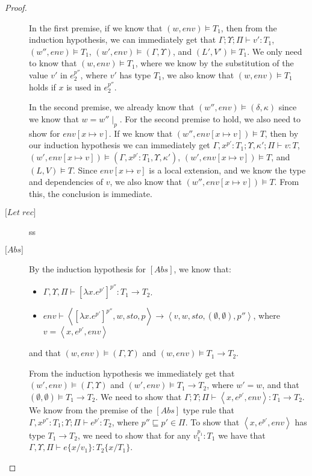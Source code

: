 \documentclass[../../../master.tex]{subfiles}
\begin{document}
\begin{proof}
\begin{description}
			In the first premise, if we know that $(w,env)\models T_1$, then from the induction hypothesis, we can immediately get that $\Gamma;\Upsilon;\Pi\vdash v':T_1$, $(w'',env)\models T_1$, $(w',env)\models(\Gamma,\Upsilon)$, and $(L',V')\models T_1$.
			We only need to know that $(w,env)\models T_1$, where we know by the substitution of the value $v'$ in $e_2^{p''}$, where $v'$ has type $T_1$, we also know that $(w,env)\models T_1$ holds if $x$ is used in $e_2^{p''}$.


			In the second premise, we already know that $(w'',env)\models(\delta,\kappa)$ since we know that $w=w''\mid_p$.
			For the second premise to hold, we also need to show for $env[x\mapsto v]$.
			If we know that $(w'',env[x\mapsto v])\models T$, then by our induction hypothesis we can immediately get $\Gamma,x^{p'}:T_1;\Upsilon,\kappa';\Pi\vdash v:T$, $(w',env[x\mapsto v])\models(\Gamma,x^{p'}:T_1,\Upsilon,\kappa')$, $(w',env[x\mapsto v])\models T$, and $(L,V)\models T$.
			Since $env[x\mapsto v]$ is a local extension, and we know the type and dependencies of $v$, we also know that $(w'',env[x\mapsto v])\models T$.
			From this, the conclusion is immediate.
			
		\item[$\lbrack Let \; rec \rbrack$] ss
		\item[$\lbrack Abs \rbrack$] By the induction hypothesis for $[Abs]$, we know that:
			\begin{itemize}
				\item $\Gamma,\Upsilon,\Pi\vdash [\lambda x.e^{p'}]^{p''}:T_1\rightarrow T_2$.
				\item $env\vdash\left\langle [\lambda x.e^{p'}]^{p''},w,sto,p\right\rangle\rightarrow\left\langle v,w,sto,(\emptyset,\emptyset),p''\right\rangle$, where $v=\left\langle x, e^{p'}, env \right\rangle$
			\end{itemize}
			and that $(w,env)\models(\Gamma,\Upsilon)$ and $(w,env)\models T_1\rightarrow T_2$.

			From the induction hypothesis we immediately get that $(w',env)\models(\Gamma,\Upsilon)$ and $(w',env)\models T_1\rightarrow T_2$, where $w'=w$, and that $(\emptyset,\emptyset)\models T_1\rightarrow T_2$.
			We need to show that $\Gamma;\Upsilon;\Pi\vdash \left\langle x, e^{p'}, env \right\rangle:T_1\rightarrow T_2$.
			We know from the premise of the $[Abs]$ type rule that $\Gamma,x^{p''}:T_1;\Upsilon;\Pi\vdash e^{p'}:T_2$, where $p''\sqsubseteq p'\in\Pi$.
			To show that $\left\langle x, e^{p'}, env \right\rangle$ has type $T_1\rightarrow T_2$, we need to show that for any $v_1^{p_1}:T_1$ we have that $\Gamma,\Upsilon,\Pi\vdash e\{x/v_1\} : T_2\{x/T_1\}$.


\end{description}
\end{proof}
\end{document}
